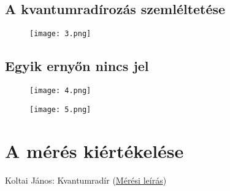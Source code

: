 \documentclass[12pt,a4paper]{article}
\begin{document}
\subsection{A kvantumradírozás szemléltetése}
\begin{figure}[h]
\centering
\texttt{[image: 3.png]}
\end{figure}

\pagebreak
\subsection{Egyik ernyőn nincs jel}

\begin{figure}[h]
\centering
\begin{minipage}{.5\textwidth}
  \centering
  \texttt{[image: 4.png]}
  \label{fig:test3}
\end{minipage}%
\begin{minipage}{.5\textwidth}
  \centering
  \texttt{[image: 5.png]}
  \label{fig:test4}
\end{minipage}
\end{figure}


\section{A mérés kiértékelése}


\begin{thebibliography}{1}

Koltai János: Kvantumradír
(\href{http://wigner.elte.hu/koltai/labor/parts/modern15.pdf}{Mérési leírás})


\end{thebibliography}
\end{document}
